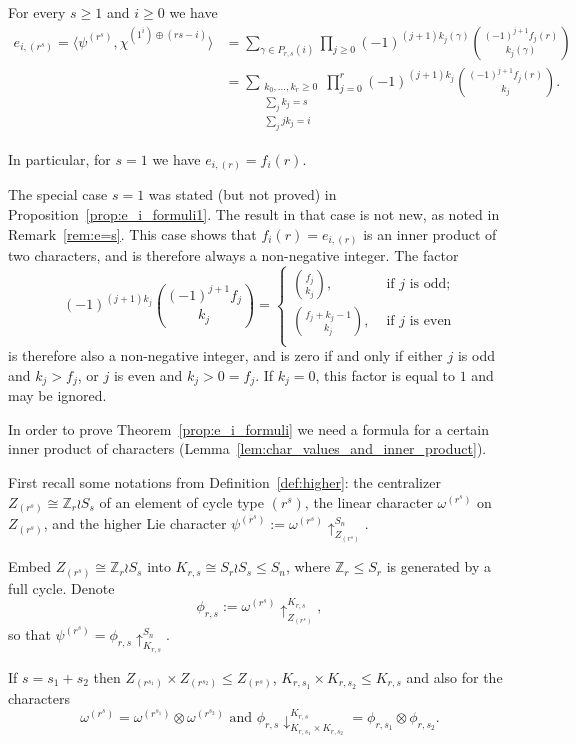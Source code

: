 \documentclass[ALCO,published]{cedram}
\def\ZZ{{\mathbb Z}}
\begin{document}
\begin{theorem}\label{prop:e_i_formuli}
    For every $s\geq 1$ and $i\geq 0$ we have
    \begin{align*}
        e_{i,(r^s)}
        = \langle \psi^{(r^s)}, \chi^{(1^i) \oplus (rs-i)} \rangle 
        &= \sum_{\gamma\in P_{r,s}(i)} \prod_{j \ge 0}
        (-1)^{(j+1)k_j(\gamma)} \binom{(-1)^{j+1} f_j(r)}{k_j(\gamma)} \\
        &= \sum_{\substack{k_0, \dots, k_r \ge 0 \\ \sum_j k_j = s \\ \sum_j jk_j = i}} \prod_{j = 0}^{r}
        (-1)^{(j+1)k_j} \binom{(-1)^{j+1} f_j(r)}{k_j}.
    \end{align*}
		
    In particular, for $s=1$ we have $e_{i,(r)} = f_i(r)$.
\end{theorem}

\begin{remark}\label{rem:when_factor_is_zero}
    The special case $s=1$ was stated (but not proved) in  Proposition~\ref{prop:e_i_formuli1}.
    The result in that case is not new, as noted in Remark~\ref{rem:e=s}. 
    This case
    shows that $f_i(r) = e_{i,(r)}$ is an inner product of two characters, and is therefore always a non-negative integer. The factor
    \[
        (-1)^{(j+1)k_j} \binom{(-1)^{j+1} f_j}{k_j}
        = \begin{cases}
            \binom{f_j}{k_j}, &\text{ if } j \text{ is odd;}\\
            \binom{f_j+k_j-1}{k_j}, &\text{ if } j \text{ is even}\\
        \end{cases}
    \]
    is therefore also a non-negative integer,
    and is zero if and only if 
    either $j$ is odd and $k_j > f_j$,
    or $j$ is even and $k_j > 0 = f_j$.
    If $k_j = 0$, this factor is equal to $1$ and may be ignored.
\end{remark}
    
In order to prove Theorem~\ref{prop:e_i_formuli} we need a formula for a certain inner product of characters (Lemma~\ref{lem:char_values_and_inner_product}).

First recall some notations from Definition~\ref{def:higher}:
the centralizer $Z_{(r^s)} \cong \ZZ_r \wr S_s$ of an element of cycle type $(r^s)$,
the linear character $\omega^{(r^s)}$ on $Z_{(r^s)}$, 
and the higher Lie character
$\psi^{(r^s)} := \omega^{(r^s)}\uparrow_{Z_{(r^s)}}^{S_n}$. 

Embed $Z_{(r^s)} \cong \ZZ_r \wr S_s$ into 
$K_{r,s} \cong S_r \wr S_s \le S_n$, 
where $\ZZ_r \le S_r$ is generated by a full cycle.
Denote 
\[
    \phi_{r,s} := \omega^{(r^s)}\uparrow_{Z_{(r^s)}}^{K_{r,s}},
\]
so that $\psi^{(r^s)} = \phi_{r,s}\uparrow_{K_{r,s}}^{S_n}$. 
\begin{observation}\label{obs:phi_product} 
    If $s=s_1+s_2$ then $Z_{(r^{s_1})}\times Z_{(r^{s_2})}\leq Z_{(r^s)}$, $K_{r,s_1}\times K_{r,s_2}\leq K_{r,s}$ and also for the characters
    \[ 
        \omega^{(r^s)}
        = \omega^{(r^{s_1})}\otimes\omega^{(r^{s_2})}\text{ and }  \phi_{r,s}\downarrow^{K_{r,s}}_{K_{r,s_1}\times K_{r,s_2}}=\phi_{r,s_1}\otimes\phi_{r,s_2}.
    \]
\end{observation}
\end{document}
